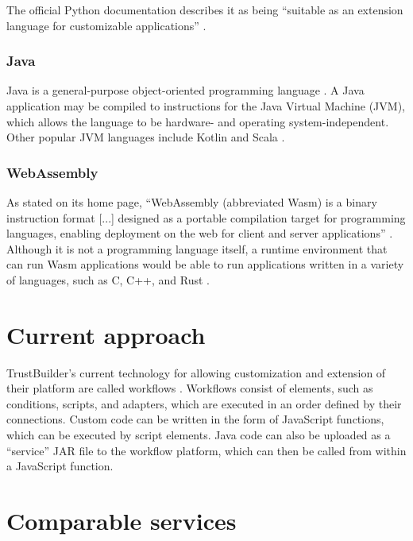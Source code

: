 The official Python documentation describes it as being ``suitable as an extension language for customizable applications'' \autocite{PSF2023}.

\subsubsection{Java}
Java is a general-purpose object-oriented programming language \autocite{Lindholm2015}. A Java application may be compiled to instructions for the Java Virtual Machine (JVM), which allows the language to be hardware- and operating system-independent. Other popular JVM languages include Kotlin and Scala \autocite{StackOverflow2023, JetBrains2023}.

\subsubsection{WebAssembly}
As stated on its home page, ``WebAssembly (abbreviated Wasm) is a binary instruction format [...] designed as a portable compilation target for programming languages, enabling deployment on the web for client and server applications'' \autocite{WebAssembly}. Although it is not a programming language itself, a runtime environment that can run Wasm applications would be able to run applications written in a variety of languages, such as C, C++, and Rust \autocite{EmscriptenContributors2015, RWWG2023}.

\section{Current approach}
TrustBuilder's current technology for allowing customization and extension of their platform are called workflows \autocite{DefiningWorkflows}. Workflows consist of elements, such as conditions, scripts, and adapters, which are executed in an order defined by their connections. Custom code can be written in the form of JavaScript functions, which can be executed by script elements. Java code can also be uploaded as a ``service'' JAR file to the workflow platform, which can then be called from within a JavaScript function.

\section{Comparable services}
